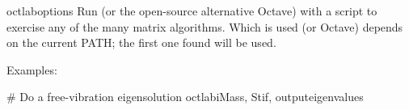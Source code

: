 % 
% 

\begin{cmdref}{octlab}{options}
Run \Matlab{} (or the open-source alternative Octave)
 with a script to exercise any of the many matrix algorithms.
Which is used (\Matlab or Octave) depends
on the current PATH; the first one found will be used.
\begin{subopts}
\end{subopts}
Examples:
\begin{example}
   # Do a free-vibration eigensolution
   octlab{i{Mass, Stif}, output{eigenvalues}}
\end{example}
\end{cmdref}


